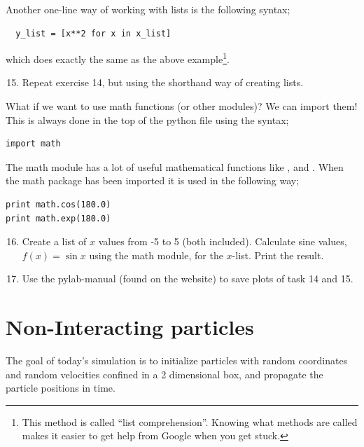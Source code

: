 \documentclass{article}
\begin{document}
Another one-line way of working with lists is the following syntax;

\begin{lstlisting}
  y_list = [x**2 for x in x_list]
\end{lstlisting}

which does exactly the same as the above example\footnote{This method is
called ``list comprehension''. Knowing what methods are called makes
it easier to get help from Google when you get stuck. }.

\begin{enumerate}
  \setcounter{enumi}{14}
  \item Repeat exercise 14, but using the shorthand way of creating lists.
\end{enumerate}

What if we want to use math functions (or other modules)?
We can import them! This is always done in the top of the
python file using the syntax;

\begin{lstlisting}
import math
\end{lstlisting}

The math module has a lot of useful mathematical functions like ,
 and . When the math package has been imported it is used
in the following way;

\begin{lstlisting}
print math.cos(180.0)
print math.exp(180.0)
\end{lstlisting}

\begin{enumerate}
  \setcounter{enumi}{15}
  \item Create a list of $x$ values from -5 to 5 (both included).
    Calculate sine values, $f(x) = \sin{x}$ using the math module,
    for the $x$-list.
    Print the result.
  \item Use the pylab-manual (found on the website) to save plots of 
    task 14 and 15.
\end{enumerate}


\newpage
\section{Non-Interacting particles}

The goal of today's simulation is to initialize particles with random
coordinates and random velocities confined in a 2 dimensional box,
and propagate the particle positions in time.\\
\end{document}
